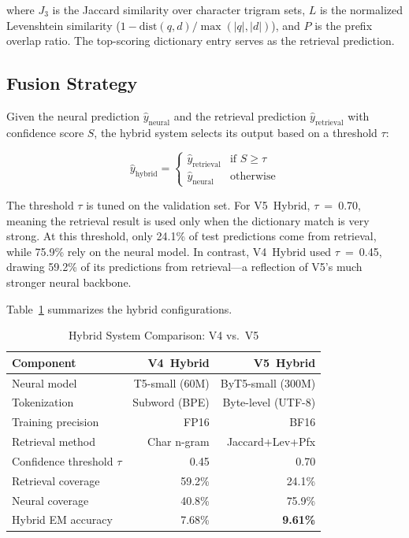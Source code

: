 \documentclass[conference]{IEEEtran}
\begin{document}
\noindent where $J_3$ is the Jaccard similarity over character trigram sets, $L$ is the normalized Levenshtein similarity ($1 - \text{dist}(q,d)/\max(|q|,|d|)$), and $P$ is the prefix overlap ratio. The top-scoring dictionary entry serves as the retrieval prediction.

\subsection{Fusion Strategy}

Given the neural prediction $\hat{y}_\text{neural}$ and the retrieval prediction $\hat{y}_\text{retrieval}$ with confidence score $S$, the hybrid system selects its output based on a threshold $\tau$:

\begin{equation}
\hat{y}_\text{hybrid} = \begin{cases}
\hat{y}_\text{retrieval} & \text{if } S \geq \tau \\
\hat{y}_\text{neural} & \text{otherwise}
\end{cases}
\end{equation}

The threshold $\tau$ is tuned on the validation set. For V5~Hybrid, $\tau$~=~0.70, meaning the retrieval result is used only when the dictionary match is very strong. At this threshold, only 24.1\% of test predictions come from retrieval, while 75.9\% rely on the neural model. In contrast, V4~Hybrid used $\tau$~=~0.45, drawing 59.2\% of its predictions from retrieval---a reflection of V5's much stronger neural backbone.

Table~\ref{tab:hybrid} summarizes the hybrid configurations.

\begin{table}[htbp]
\centering
\caption{Hybrid System Comparison: V4 vs.\ V5}
\label{tab:hybrid}
\begin{tabular}{lrr}
\toprule
\textbf{Component} & \textbf{V4~Hybrid} & \textbf{V5~Hybrid} \\
\midrule
Neural model & T5-small (60M) & ByT5-small (300M) \\
Tokenization & Subword (BPE) & Byte-level (UTF-8) \\
Training precision & FP16 & BF16 \\
Retrieval method & Char n-gram & Jaccard+Lev+Pfx \\
Confidence threshold $\tau$ & 0.45 & 0.70 \\
Retrieval coverage & 59.2\% & 24.1\% \\
Neural coverage & 40.8\% & 75.9\% \\
\midrule
Hybrid EM accuracy & 7.68\% & \textbf{9.61\%} \\
\bottomrule
\end{tabular}
\end{table}
\end{document}
